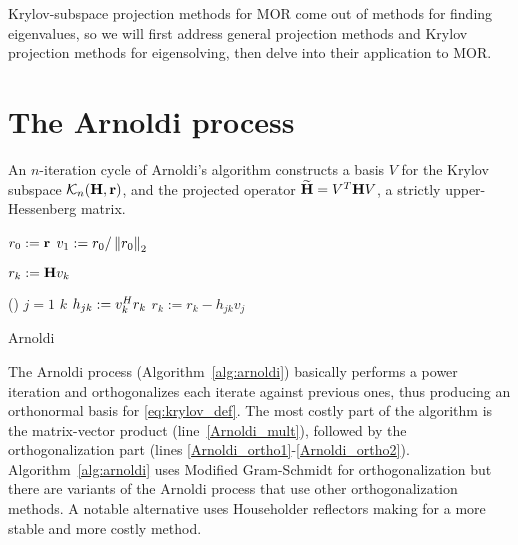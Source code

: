 Krylov-subspace  projection methods for MOR come out of methods for  finding eigenvalues, so we will first address general projection methods and Krylov projection methods for eigensolving, then delve into their application to MOR.  


\section{The Arnoldi process}
   \label{sec:arnoldi}
   An $n$-iteration  cycle of Arnoldi's algorithm constructs a basis $V$ for the Krylov 
   subspace  $\krylov{n}{\H}{\Rr}$, and the projected operator $\Himp = V^T \H V$, a strictly upper-Hessenberg matrix. 

\begin{algorithm}[htb]%
\DontPrintSemicolon
{}

$r_0 := \Rr$ \;
$v_1 := r_0 / \nrm{2}{r_0}$\;
 {
	$r_k := \H v_{k}$\; \label{Arnoldi_mult}

	\For(\qquad{}){ $j = 1$ \KwTo $k$}{	\label{Arnoldi_ortho1}
		$h_{jk} := \c{v_k}r_k$ \label{Arnoldi_ortho1_5} \;
		$r_k := r_k - h_{jk}v_j$\; \label{Arnoldi_ortho2}
}
\BlankLine
}
\;
\caption{{\sc Arnoldi}}
\label{alg:arnoldi}
\end{algorithm}

The Arnoldi process (Algorithm~\ref{alg:arnoldi}) basically performs a power iteration and orthogonalizes each iterate against previous ones, thus producing an orthonormal basis for \eqref{eq:krylov_def}.   The most costly part of the algorithm is the matrix-vector product (line~\ref{Arnoldi_mult}), followed by the orthogonalization part (lines \ref{Arnoldi_ortho1}-\ref{Arnoldi_ortho2}).  
Algorithm~\ref{alg:arnoldi} uses Modified Gram-Schmidt for orthogonalization but there are variants of the Arnoldi process that use other orthogonalization methods. A notable alternative uses Householder reflectors making for a more stable and more costly method.   

